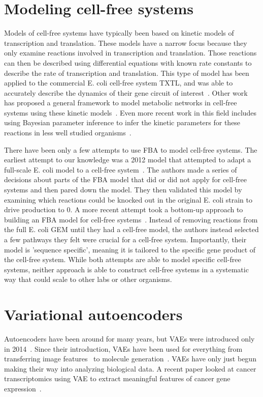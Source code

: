 \section{Modeling cell-free systems}\label{rw:mod-cf}
Models of cell-free systems have typically been based on kinetic models of transcription and translation.
These models have a narrow focus because they only examine reactions involved in transcription and translation.
Those reactions can then be described using differential equations with known rate constants to describe the rate of transcription and translation.
This type of model has been applied to the commercial E. coli cell-free system TXTL, and was able to accurately describe the dynamics of their gene circuit of interest~\cite{tuza2013silico}.
Other work has proposed a general framework to model metabolic networks in cell-free systems using these kinetic models~\cite{wayman2015dynamic}.
Even more recent work in this field includes using Bayesian parameter inference to infer the kinetic parameters for these reactions in less well studied organisms~\cite{moore2018rapid}.

There have been only a few attempts to use FBA to model cell-free systems.
The earliest attempt to our knowledge was a 2012 model that attempted to adapt a full-scale E. coli model to a cell-free system~\cite{bujara2012silico}.
The authors made a series of decisions about parts of the FBA model that did or did not apply for cell-free systems and then pared down the model.
They then validated this model by examining which reactions could be knocked out in the original E. coli strain to drive production to 0.
A more recent attempt took a bottom-up approach to building an FBA model for cell-free systems~\cite{vilkhovoy2017sequence}.
Instead of removing reactions from the full E. coli GEM until they had a cell-free model, the authors instead selected a few pathways they felt were crucial for a cell-free system.
Importantly, their model is 'sequence specific', meaning it is tailored to the specific gene product of the cell-free system.
While both attempts are able to model specific cell-free systems, neither approach is able to construct cell-free systems in a systematic way that could scale to other labs or other organisms.


\section{Variational autoencoders}
Autoencoders have been around for many years, but VAEs were introduced only in 2014~\cite{kingma2013auto, rezende2014stochastic}.
Since their introduction, VAEs have been used for everything from transferring image features~\cite{larsen2015autoencoding} to molecule generation~\cite{gomez2016automatic}.
VAEs have only just begun making their way into analyzing biological data.
A recent paper looked at cancer transcriptomics using VAE to extract meaningful features of cancer gene expression~\cite{way2017extracting}.

